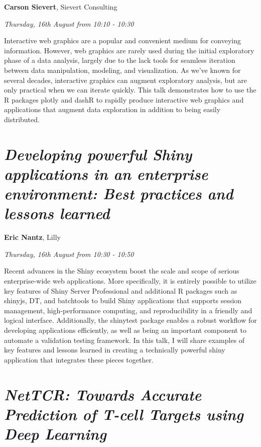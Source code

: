 \documentclass[]{book}
\theoremstyle{definition}
\theoremstyle{definition}
\theoremstyle{definition}
\theoremstyle{remark}
\begin{document}
\textbf{Carson Sievert}, Sievert Consulting

\emph{Thursday, 16th August from 10:10 - 10:30}

Interactive web graphics are a popular and convenient medium for
conveying information. However, web graphics are rarely used during the
initial exploratory phase of a data analysis, largely due to the lack
tools for seamless iteration between data manipulation, modeling, and
visualization. As we've known for several decades, interactive graphics
can augment exploratory analysis, but are only practical when we can
iterate quickly. This talk demonstrates how to use the R packages plotly
and dashR to rapidly produce interactive web graphics and applications
that augment data exploration in addition to being easily distributed.

\hypertarget{developing-powerful-shiny-applications-in-an-enterprise-environment-best-practices-and-lessons-learned-1}{%
\section{\texorpdfstring{\emph{Developing powerful Shiny applications in
an enterprise environment: Best practices and lessons
learned}}{Developing powerful Shiny applications in an enterprise environment: Best practices and lessons learned}}\label{developing-powerful-shiny-applications-in-an-enterprise-environment-best-practices-and-lessons-learned-1}}

\textbf{Eric Nantz}, Lilly

\emph{Thursday, 16th August from 10:30 - 10:50}

Recent advances in the Shiny ecosystem boost the scale and scope of
serious enterprise-wide web applications. More specifically, it is
entirely possible to utilize key features of Shiny Server Professional
and additional R packages such as shinyjs, DT, and batchtools to build
Shiny applications that supports session management, high-performance
computing, and reproducibility in a friendly and logical interface.
Additionally, the shinytest package enables a robust workflow for
developing applications efficiently, as well as being an important
component to automate a validation testing framework. In this talk, I
will share examples of key features and lessons learned in creating a
technically powerful shiny application that integrates these pieces
together.

\hypertarget{nettcr-towards-accurate-prediction-of-t-cell-targets-using-deep-learning-1}{%
\section{\texorpdfstring{\emph{NetTCR: Towards Accurate Prediction of
T-cell Targets using Deep
Learning}}{NetTCR: Towards Accurate Prediction of T-cell Targets using Deep Learning}}\label{nettcr-towards-accurate-prediction-of-t-cell-targets-using-deep-learning-1}}
\end{document}
